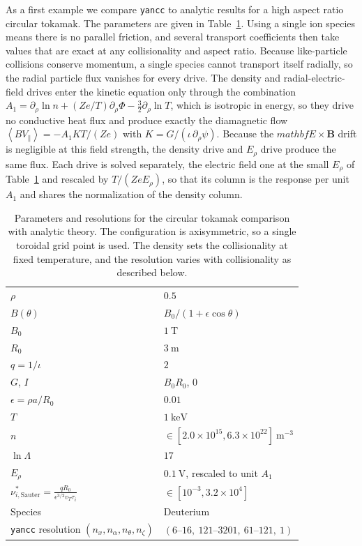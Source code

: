 \documentclass[11pt]{article}
\newcommand{\yancc}{\texttt{yancc}}
\newcommand{\fsa}[1]{\left\langle #1 \right\rangle}
\begin{document}
As a first example we compare \yancc{} to analytic results for a high aspect ratio
circular tokamak. The parameters are given in Table~\ref{tab:bench-circular}. Using a
single ion species means there is no parallel friction, and several transport
coefficients then take values that are exact at any collisionality and aspect ratio.
Because like-particle collisions conserve momentum, a single species cannot transport
itself radially, so the radial particle flux vanishes for every drive. The density and
radial-electric-field drives enter the kinetic equation only through the combination
$A_1 = \partial_\rho \ln n + (Z e/T)\partial_\rho\Phi - \tfrac{3}{2}\partial_\rho \ln T$,
which is isotropic in energy, so they drive no conductive heat flux and produce exactly
the diamagnetic flow $\fsa{B V_\parallel} = -A_1 K T/(Z e)$ with
$K = G/(\iota\,\partial_\rho\psi)$. Because the $mathbf{E}\times\mathbf{B}$ drift is
negligible at this field strength, the density drive and $E_\rho$ drive produce the same
flux. Each drive
is solved separately, the electric field one at the small $E_\rho$ of
Table~\ref{tab:bench-circular} and rescaled by $T/(Z e E_\rho)$, so that its column is
the response per unit $A_1$ and shares the normalization of the density column.

\begin{table}[htbp]
\centering
\begin{tabular}{ll}
\toprule
$\rho$ & $0.5$ \\
$B(\theta)$ & $B_0 / (1 + \epsilon \cos\theta)$ \\
$B_0$ & $1~\mathrm{T}$ \\
$R_0$ & $3~\mathrm{m}$ \\
$q = 1/\iota$ & $2$ \\
$G$, $I$ & $B_0 R_0$, $0$ \\
$\epsilon = \rho a / R_0$ & $0.01$ \\
$T$ & $1~\mathrm{keV}$ \\
$n$ & $\in [2.0 \times 10^{15}, 6.3 \times 10^{22}]~\mathrm{m}^{-3}$ \\
$\ln\Lambda$ & $17$ \\
$E_\rho$ & $0.1~\mathrm{V}$, rescaled to unit $A_1$ \\
$\nu^*_{i,\mathrm{Sauter}} = \frac{q R_0}{\epsilon^{3/2} v_T \tau_i}$ & $\in [10^{-3},
3.2 \times 10^{4}]$ \\
Species & Deuterium \\
\yancc{} resolution $(n_x, n_\alpha, n_\theta, n_\zeta)$ & $(6\text{--}16,\
121\text{--}3201,\ 61\text{--}121,\ 1)$ \\
\bottomrule
\end{tabular}
\caption{Parameters and resolutions for the circular tokamak comparison with analytic
theory. The configuration is axisymmetric, so a single toroidal grid point is used. The
density sets the collisionality at fixed temperature, and the resolution varies with
collisionality as described below.}
\label{tab:bench-circular}
\end{table}
\end{document}
